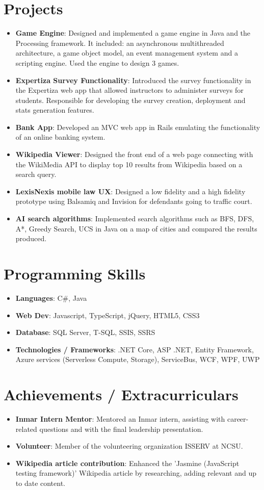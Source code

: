 \documentclass[letterpaper,11pt]{article}
\newcommand{\resumeItem}[2]{
  \item\small{
    \textbf{#1}{: #2 \vspace{-2pt}}
  }
}
\newcommand{\resumeSubItem}[2]{\resumeItem{#1}{#2}\vspace{-4pt}}
\newcommand{\resumeSubHeadingListStart}{\begin{itemize}[leftmargin=*]}
\newcommand{\resumeSubHeadingListEnd}{\end{itemize}}
\begin{document}

\section{Projects}
  \resumeSubHeadingListStart
    \resumeSubItem{Game Engine}
      {Designed and implemented a game engine in Java and the Processing framework. It included: an asynchronous multithreaded architecture, a game object model, an event management system and a scripting engine. Used the engine to design 3 games.}
    \resumeSubItem{Expertiza Survey Functionality}
      {Introduced the survey functionality in the Expertiza web app that allowed instructors to administer surveys for students. Responsible for developing the survey creation, deployment and stats generation features.}
    \resumeSubItem{Bank App}
      {Developed an MVC web app in Rails emulating the functionality of an online banking system.}
    \resumeSubItem{Wikipedia Viewer}
      {Designed the front end of a web page connecting with the WikiMedia API to display top 10 results from Wikipedia based on a search query.}
    \resumeSubItem{LexisNexis mobile law UX}
      {Designed a low fidelity and a high fidelity prototype using Balsamiq and Invision for defendants going to traffic court.}
      \resumeSubItem{AI search algorithms}
      {Implemented search algorithms such as BFS, DFS, A*, Greedy Search, UCS in Java on a map of cities and compared the results produced.}
  \resumeSubHeadingListEnd


\section{Programming Skills}
  \resumeSubHeadingListStart
    \resumeSubItem{Languages}{C\#, Java}
    \resumeSubItem{Web Dev}{Javascript, TypeScript, jQuery, HTML5, CSS3}
    \resumeSubItem{Database}{SQL Server, T-SQL, SSIS, SSRS}    
    \resumeSubItem{Technologies / Frameworks}{.NET Core, ASP .NET, Entity Framework, Azure services (Serverless Compute, Storage), ServiceBus, WCF, WPF, UWP}
  \resumeSubHeadingListEnd


\section{Achievements / Extracurriculars}
  \resumeSubHeadingListStart
    \resumeSubItem{Inmar Intern Mentor}
      {Mentored an Inmar intern, assisting with career-related questions and with the final leadership presentation.}
    \resumeSubItem{Volunteer}
      {Member of the volunteering organization ISSERV at NCSU.}
    \resumeSubItem{Wikipedia article contribution}
      {Enhanced the 'Jasmine (JavaScript testing framework)' Wikipedia article by researching, adding relevant and up to date content.}
  \resumeSubHeadingListEnd

\end{document}
